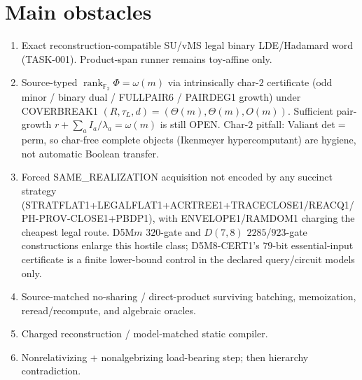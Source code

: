\documentclass[11pt]{article}
\begin{document}
\section*{Main obstacles}
\begin{enumerate}
\item Exact reconstruction-compatible SU/vMS legal binary LDE/Hadamard word
(TASK-001). Product-span runner remains toy-affine only.
\item Source-typed $\operatorname{rank}_{\mathbb F_2}\Phi=\omega(m)$ via
intrinsically char-$2$ certificate (odd minor / binary dual / FULLPAIR6 /
PAIRDEG1 growth) under COVERBREAK1
$(R,\tau_L,d)=(\Theta(m),\Theta(m),O(m))$. Sufficient pair-growth
$r+\sum_a I_a/\lambda_a=\omega(m)$ is still OPEN. Char-$2$ pitfall: Valiant
det$=$perm, so char-free complete objects (Ikenmeyer hypercomputant) are
hygiene, not automatic Boolean transfer.
\item Forced SAME\_REALIZATION acquisition not encoded by any succinct strategy
(STRATFLAT1+LEGALFLAT1+ACRTREE1+TRACECLOSE1/REACQ1/PH-PROV-CLOSE1+PBDP1), with
ENVELOPE1/RAMDOM1 charging the cheapest legal route. D5M$m$ $320$-gate and
$D(7,8)$ $2285$/$923$-gate constructions enlarge this hostile class;
D5M8-CERT1's $79$-bit essential-input certificate is a finite lower-bound
control in the declared query/circuit models only.
\item Source-matched no-sharing / direct-product surviving batching, memoization,
reread/recompute, and algebraic oracles.
\item Charged reconstruction / model-matched static compiler.
\item Nonrelativizing + nonalgebrizing load-bearing step; then hierarchy
contradiction.
\end{enumerate}
\end{document}

